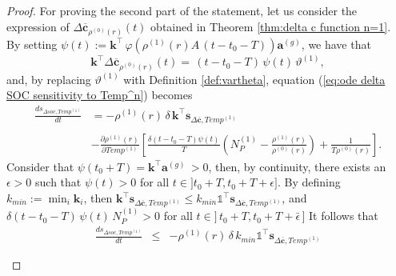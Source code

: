 \begin{proof}
\bigskip 
\noindent For proving the second part of the statement, let us consider the expression of $\Delta \mathbf{\overline c}_{\rho^{(0)}(r)}(t) $ obtained in  Theorem \ref{thm:delta c function n=1}. \\By setting
$\psi(t):=\mathbf{k}^\intercal\,\varphi\left( \rho^{(1)}(r) A\,(t-t_0-T)\right)\mathbf{a}^{(g)}$, we have that 
$$
\mathbf{k}^\intercal \Delta \mathbf{\overline c}_{\rho^{(0)}(r)}(t) = 
\,(t-t_0-T)\, \psi(t)\, \vartheta^{(1)},
$$
\noindent and, by replacing $\vartheta^{(1)}$ with Definition \ref{def:vartheta}, equation (\ref{eq:ode delta SOC sensitivity to Temp^n}) becomes
$$\begin{array}{ll}
\displaystyle \frac{d s_{\Delta soc,Temp^{(1)}}}{dt} &= -\rho^{(1)}(r)\, \delta \,\mathbf{k}^\intercal \mathbf{s}_{\Delta \mathbf{\overline c},Temp^{(1)}}\\\\
\qquad&-
 \displaystyle \frac{\partial\rho^{(1)}(r)}{\partial Temp^{(1)}}\!\left[
 \displaystyle \frac{ \delta (t-t_0-T) \psi(t)}{T}\left( N_P^{(1)}- \displaystyle \frac{\rho^{(1)}(r)}{\rho^{(0)}(r)}\right)\!+  \displaystyle \frac{1}{T\rho^{(0)}(r)} \right].
\end{array}
$$
Consider that $\psi(t_0+T)= \mathbf{k}^\intercal \mathbf{a}^{(g)} \, >0$, then, by continuity,
 there exists an $\epsilon>0$ such that %
$\psi(t)>0$ for all $t\in]t_0+T, t_0+T+\epsilon]$.
By defining $k_{min}:=\min_i{\mathbf{k}_i}$, then 
 $\mathbf{k}^\intercal \mathbf{s}_{\Delta \mathbf{\overline c},Temp^{(1)}}\leq k_{min}\mathds{1}^\intercal \mathbf{s}_{\Delta \mathbf{\overline c},Temp^{(1)}}$, and $\delta (t-t_0-T)\, \psi(t)\,N_P^{(1)}>0$ for all $t\in]\,t_0+T,t_0+T+\bar \epsilon\,]$ It follows that
$$\begin{array}{rcl}
\displaystyle \frac{d s_{\Delta soc,Temp^{(1)}}}{dt} &\leq & -\rho^{(1)}(r)\, \delta \,k_{min}\mathds{1}^\intercal \mathbf{s}_{\Delta \mathbf{\overline c},Temp^{(1)}}\\\\

\end{array}$$
\end{proof}
